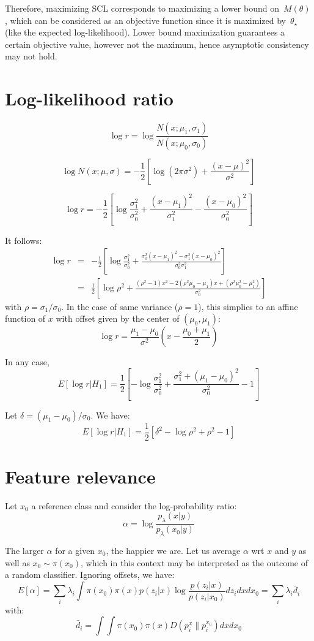 \documentclass[english]{scrartcl}
\begin{document}
Therefore, maximizing SCL corresponds to maximizing a lower bound on~$M(\theta)$, which can be considered as an objective function since it is maximized by~$\theta_\star$ (like the expected log-likelihood). Lower bound maximization guarantees a certain objective value, however not the maximum, hence asymptotic consistency may not hold.

\section{Log-likelihood ratio}

$$
\log r = \log \frac{N(x;\mu_1,\sigma_1)}{N(x;\mu_0,\sigma_0)}
$$

$$
\log N(x;\mu,\sigma) = -\frac{1}{2}\left[
\log(2\pi\sigma^2) + \frac{(x-\mu)^2}{\sigma^2}
\right]
$$

$$
\log r = -\frac{1}{2}
\left[
\log \frac{\sigma_1^2}{\sigma_0^2}
+ \frac{(x-\mu_1)^2}{\sigma_1^2} - \frac{(x-\mu_0)^2}{\sigma_0^2}
\right]
$$

It follows:
\begin{eqnarray*}
\log r 
 & = & 
-\frac{1}{2}\left[
\log \frac{\sigma_1^2}{\sigma_0^2}
+ \frac{\sigma_0^2(x-\mu_1)^2 - \sigma_1^2(x-\mu_0)^2}{\sigma_0^2 \sigma_1^2}
\right] \\
 & = & 
\frac{1}{2}\left[
\log \rho^2
+ \frac{(\rho^2-1)x^2 - 2(\rho^2\mu_0-\mu_1)x+ (\rho^2\mu_0 ^2-\mu_1^2)}{\sigma_0^2}
\right]
\end{eqnarray*}
with $\rho=\sigma_1/\sigma_0$. In the case of same variance ($\rho=1$), this simplies to an affine function of $x$ with offset given by the center of $(\mu_0,\mu_1)$:
$$
\log r = \frac{\mu_1-\mu_0}{\sigma^2} \left(
x - \frac{\mu_0 + \mu_1}{2}
\right) 
$$

In any case,
$$
E[\log r | H_1] = 
\frac{1}{2}
\left[
- \log \frac{\sigma_1^2}{\sigma_0^2}
+ \frac{\sigma_1^2 + (\mu_1-\mu_0)^2}{\sigma_0^2}
- 1
\right]
$$

Let $\delta = (\mu_1-\mu_0)/\sigma_0$. We have:
$$
E[\log r | H_1] = 
\frac{1}{2}
\left[
\delta^2
- \log \rho^2
+ \rho^2  - 1
\right]
$$


\section{Feature relevance}

Let $x_0$ a reference class and consider the log-probability ratio:
$$
\alpha = \log \frac{p_\lambda(x|y)}{p_\lambda(x_0|y)}
$$

The larger $\alpha$ for a given $x_0$, the happier we are. Let us average $\alpha$ wrt $x$ and $y$ as well as $x_0\sim \pi(x_0)$, which in this context may be interpreted as the outcome of a random classifier. Ignoring offsets, we have:
$$
E[\alpha]
= \sum_i \lambda_i \int \pi(x_0)\pi(x) p(z_i|x) \log\frac{p(z_i|x)}{p(z_i|x_0)} dz_i dx dx_0
= \sum_i \lambda_i \bar{d}_i
$$
with:
$$
\bar{d}_i =
\int \int \pi(x_0) \pi(x) D(p_i^x\|p_i^{x_0}) dx dx_0
$$
\end{document}
